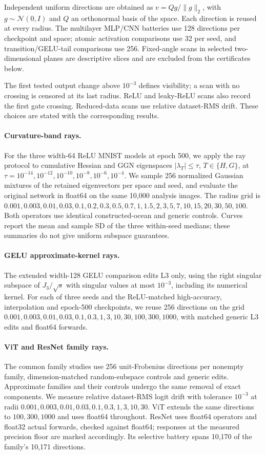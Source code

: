 Independent uniform directions are obtained as $v=Qg/\|g\|_2$, with $g\sim\mathcal N(0,I)$ and $Q$ an orthonormal basis of the space. Each direction is reused at every radius. The multilayer MLP/CNN batteries use 128 directions per checkpoint and space; atomic activation comparisons use 32 per seed, and transition/GELU-tail comparisons use 256. Fixed-angle scans in selected two-dimensional planes are descriptive slices and are excluded from the certificates below.

The first tested output change above $10^{-3}$ defines visibility; a scan with no crossing is censored at its last radius. ReLU and leaky-ReLU scans also record the first gate crossing. Reduced-data scans use relative dataset-RMS drift. These choices are stated with the corresponding results.

\paragraph{Curvature-band rays.}\label{app:methods-curvature-rays}
For the three width-64 ReLU MNIST models at epoch 500, we apply the ray protocol to cumulative Hessian and GGN eigenspaces $|\lambda_T|\le\tau$, $T\in\{H,G\}$, at $\tau=10^{-14},10^{-12},10^{-10},10^{-8},10^{-6},10^{-4}$. We sample 256 normalized Gaussian mixtures of the retained eigenvectors per space and seed, and evaluate the original network in float64 on the same 10,000 analysis images. The radius grid is $0.001,0.003,0.01,0.03,0.1,0.2,0.3,0.5,0.7,1,1.5,2,3,5,7,10,15,20,30,50,100$. Both operators use identical constructed-ocean and generic controls. Curves report the mean and sample SD of the three within-seed medians; these summaries do not give uniform subspace guarantees.

\paragraph{GELU approximate-kernel rays.}
The extended width-128 GELU comparison edits L3 only, using the right singular subspace of $J_3/\sqrt{s}$ with singular values at most $10^{-3}$, including its numerical kernel. For each of three seeds and the ReLU-matched high-accuracy, interpolation and epoch-500 checkpoints, we reuse 256 directions on the grid $0.001,0.003,0.01,0.03,0.1,0.3,1,3,10,30,100,300,1000$, with matched generic L3 edits and float64 forwards.

\paragraph{ViT and ResNet family rays.}
The common family studies use 256 unit-Frobenius directions per nonempty family, dimension-matched random-subspace controls and generic edits. Approximate families and their controls undergo the same removal of exact components. We measure relative dataset-RMS logit drift with tolerance $10^{-3}$ at radii $0.001,0.003,0.01,0.03,0.1,0.3,1,3,10,30$. ViT extends the same directions to $100,300,1000$ and uses float64 throughout. ResNet uses float64 operators and float32 actual forwards, checked against float64; responses at the measured precision floor are marked accordingly. Its selective battery spans 10,170 of the family's 10,171 directions.


